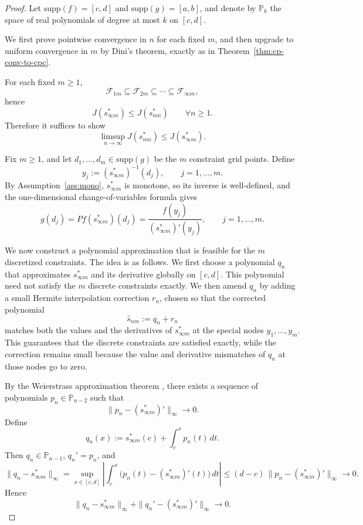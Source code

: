 \documentclass[12pt,leqno]{amsart}
\begin{document}
\begin{proof}
Let $\mathrm{supp}(f)=[c,d]$ and $\mathrm{supp}(g)=[a,b]$, and denote
by $\mathbb P_k$ the space of real polynomials of degree at most $k$
on $[c,d]$.

We first prove pointwise convergence in $n$ for each fixed $m$, and
then upgrade to uniform convergence in $m$ by Dini's theorem, exactly
as in Theorem~\ref{thm:cp-conv-to-cpc}.

For each fixed $m\ge 1$,
\[
\mathcal F_{1m}\subseteq \mathcal F_{2m}\subseteq \cdots
\subseteq \mathcal F_{\infty m},
\]
hence
\[
J(s_{\infty m}^*)\le J(s_{nm}^*)\qquad \forall n\ge 1.
\]
Therefore it suffices to show
\[
\limsup_{n\to\infty}J(s_{nm}^*)\le J(s_{\infty m}^*).
\]

Fix $m\ge 1$, and let $d_1,\dots,d_m\in\mathrm{supp}(g)$ be the $m$
constraint grid points. Define
\[
y_j:=(s_{\infty m}^*)^{-1}(d_j),\qquad j=1,\dots,m.
\]
By Assumption~\ref{ass:mono}, $s_{\infty m}^*$ is monotone, so its
inverse is well-defined, and the one-dimensional change-of-variables
formula gives
\begin{equation}\label{eq:pf-cov-poly-proof}
g(d_j)
=Pf(s_{\infty m}^*)(d_j)
=\frac{f(y_j)}{(s_{\infty m}^*)'(y_j)},
\qquad j=1,\dots,m.
\end{equation}

We now construct a polynomial approximation that is feasible for the
$m$ discretized constraints. The idea is as follows. We first choose a
polynomial $q_n$ that approximates $s_{\infty m}^*$ and its derivative
globally on $[c,d]$. This polynomial need not satisfy the $m$
discrete constraints exactly. We then amend $q_n$ by adding a small
Hermite interpolation correction $r_n$, chosen so that the corrected
polynomial
\[
\hat s_{nm}:=q_n+r_n
\]
matches both the values and the derivatives of $s_{\infty m}^*$ at the
special nodes $y_1,\dots,y_m$. This guarantees that the discrete
constraints are satisfied exactly, while the correction remains small
because the value and derivative mismatches of $q_n$ at those nodes go
to zero.

By the Weierstrass approximation theorem
\citep[Theorem~7.26]{rudin1976principles}, there exists a sequence of
polynomials $p_n\in\mathbb P_{n-2}$ such that
\[
\|p_n-(s_{\infty m}^*)'\|_\infty\to 0.
\]
Define
\[
q_n(x):=s_{\infty m}^*(c)+\int_c^x p_n(t)\,dt.
\]
Then $q_n\in\mathbb P_{n-1}$, $q_n'=p_n$, and
\[
\|q_n-s_{\infty m}^*\|_\infty
=
\sup_{x\in[c,d]}
\left|\int_c^x\bigl(p_n(t)-(s_{\infty m}^*)'(t)\bigr)\,dt\right|
\le
(d-c)\,\|p_n-(s_{\infty m}^*)'\|_\infty \to 0.
\]
Hence
\[
\|q_n-s_{\infty m}^*\|_\infty
+
\|q_n'-(s_{\infty m}^*)'\|_\infty
\to 0.
\]


\end{proof}
\end{document}
